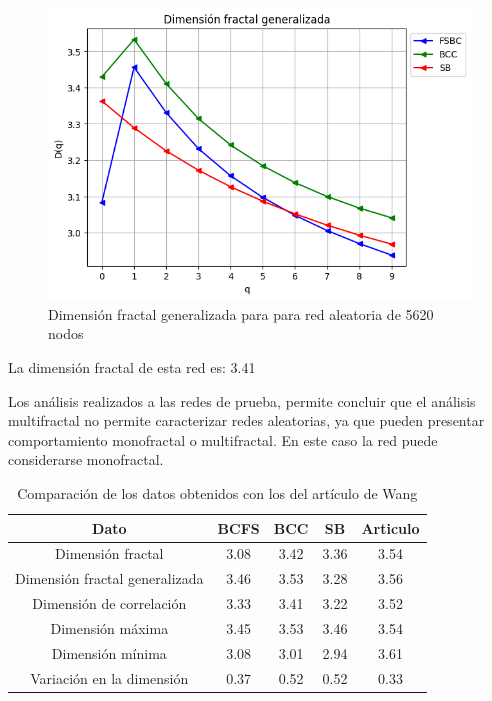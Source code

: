 \begin{figure}[H]
    \centering
    \includegraphics[scale=0.7]{Capitulo4Multifractalidad/imagenes/a_Dqrandom5620.png}
    \caption{Dimensión fractal generalizada para para red aleatoria de 5620 nodos}
\end{figure}

La dimensión fractal de esta red es: 3.41

Los análisis realizados a las redes de prueba, permite concluir que el análisis multifractal no permite caracterizar redes aleatorias, ya que pueden presentar comportamiento monofractal o multifractal. En este caso la red puede considerarse monofractal.

\begin{table}[H]
    \centering
    \begin{tabular}{|c|c|c|c|c|}
        \hline
         \textbf{Dato}& \textbf{BCFS} & \textbf{BCC} & \textbf{SB} & \textbf{Articulo} \\
         \hline
         Dimensión fractal & 3.08 & 3.42 & 3.36 & 3.54\\
         \hline
         Dimensión fractal generalizada  & 3.46 & 3.53 & 3.28 & 3.56 \\
         \hline
         Dimensión de correlación & 3.33 & 3.41  & 3.22 &3.52 \\
         \hline
         Dimensión máxima & 3.45 & 3.53 & 3.46 & 3.54\\
         \hline
         Dimensión mínima & 3.08 & 3.01 & 2.94 & 3.61\\
         \hline
         Variación en la dimensión & 0.37 &  0.52 & 0.52 & 0.33 \\
         \hline
    \end{tabular}
    \caption{Comparación de los datos obtenidos con los del artículo de Wang\cite{Wang2012}}
\end{table}



